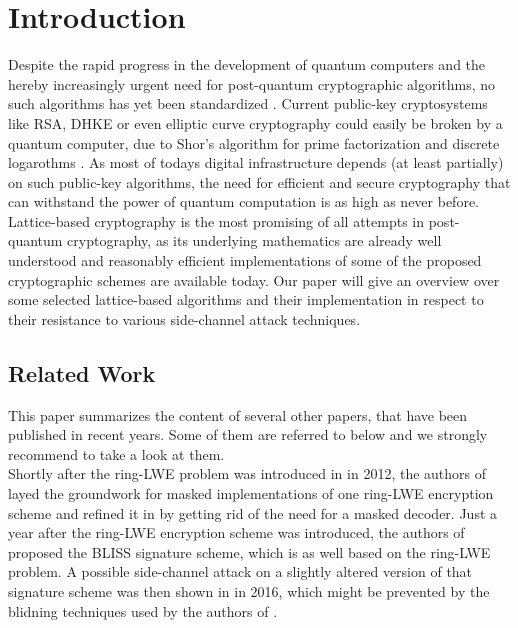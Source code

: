 %
%

\chapter{Introduction}
Despite the rapid progress in the development of quantum computers and the hereby increasingly urgent need for post-quantum cryptographic algorithms, no such algorithms has yet been standardized \cite{Nist}. Current public-key cryptosystems like RSA, DHKE or even elliptic curve cryptography could easily be broken by a quantum computer, due to Shor's algorithm for prime factorization and discrete logarothms \cite{Shor}. As most of todays digital infrastructure depends (at least partially) on such public-key algorithms, the need for efficient and secure cryptography that can withstand the power of quantum computation is as high as never before.\\
Lattice-based cryptography is the most promising of all attempts in post-quantum cryptography, as its underlying mathematics are already well understood and reasonably efficient implementations of some of the proposed cryptographic schemes are available today. Our paper will give an overview over some selected lattice-based algorithms and their implementation in respect to their resistance to various side-channel attack techniques.\\

\section{Related Work}
This paper summarizes the content of several other papers, that have been published in recent years. Some of them are referred to below and we strongly recommend to take a look at them.\\
Shortly after the ring-LWE problem was introduced in \cite{cryptoeprint:2012:230} in 2012, the authors of \cite{maskedRing} layed the groundwork for masked implementations of one ring-LWE encryption scheme and refined it in \cite{Reparaz2016} by getting rid of the need for a masked decoder. Just a year after the ring-LWE encryption scheme was introduced, the authors of \cite{bliss} proposed the BLISS signature scheme, which is as well based on the ring-LWE problem. A possible side-channel attack on a slightly altered version of that signature scheme was then shown in \cite{cryptoeprint:2016:300} in 2016, which might be prevented by the blidning techniques used by the authors of \cite{cryptoeprint:2016:276}.

